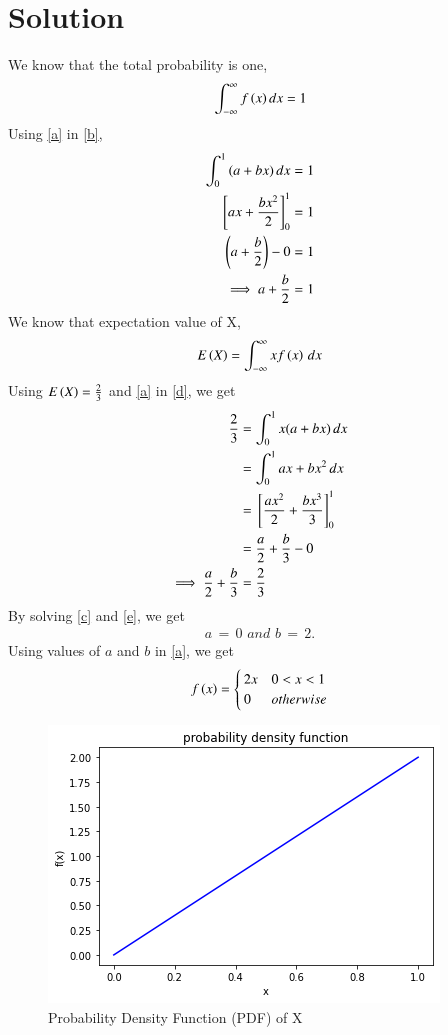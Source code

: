 \documentclass[journal,12pt,twocolumn]{IEEEtran}
\begin{document}
\section{Solution}
We know that the total probability is one,
\begin{equation}
    \int_{-\infty}^{\infty}{f\left(x\right) dx} = 1\label{b}
\end{equation}
Using \eqref{a} in \eqref{b},
\begin{align}
    \int_{0}^{1}{(a+bx)\,dx} = 1\\
    {}\left[ax+\frac{bx^2}{2}\right]_0^1=1\\
    \left(a+\frac{b}{2}\right)-0=1\\
    \implies a+\frac{b}{2}=1 \label{c}
\end{align}
We know that expectation value of X,
\begin{align}
    E\left(X\right)=\int_{-\infty}^{\infty}xf\left(x\right)\,dx\label{d}
\end{align}
\newpage
Using $E\left(X\right)=\frac{2}{3}$ and \eqref{a} in \eqref{d}, we get
\begin{align}
     \frac{2}{3}&=\int_{0}^{1}x(a+bx)\,dx\\
     &=\int_{0}^{1} ax+bx^2\,dx\\
     &= {}\left[\frac{ax^2}{2}+\frac{bx^3}{3}\right]_0^1\\
     &= \frac{a}{2}+\frac{b}{3}-0\\
     \implies\frac{a}{2}+\frac{b}{3}&=\frac{2}{3}\label{e}
\end{align}
By solving \eqref{c} and \eqref{e}, we get 
\begin{align}
    a\, =\, 0 \,\,and\,\, b\, =\, 2.
\end{align}
Using values of $a$ and $b$ in \eqref{a}, we get
\begin{align}
f\left(x\right)
= 
\begin{cases}
2x & 0<x<1
\\
0 & otherwise\label{f}\\
\end{cases}
\end{align}
\begin{figure}[ht]
    \centering
    \includegraphics[width=\columnwidth]{assign2.png}
    \caption{Probability Density Function (PDF) of X}
    \label{Figure_1}
\end{figure}
\end{document}
